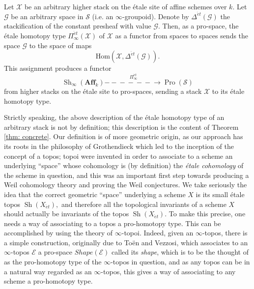 \documentclass[12pt]{amsart}
\theoremstyle{definition}
\newcommand{\cE}{\mathcal{E}}
\newcommand{\cG}{\mathcal{G}}
\newcommand{\cS}{\mathcal{S}}
\newcommand{\cX}{\mathcal{X}}
\newcommand{\Sh}{\operatorname{Sh}}
\newcommand{\Hom}{\mathrm{Hom}}
\newcommand{\et}{\acute{e}t}
\renewcommand{\i}{\infty}
\def\Pro{\operatorname{Pro}}
\def\Shi{\Sh_\i}
\def\Shape{\mathit{Shape}}
\def\longlongrightarrow{-\!\!\!-\!\!\!-\!\!\!-\!\!\!-\!\!\!-\!\!\!\longrightarrow}
\begin{document}
Let $\cX$ be an arbitrary higher stack on the \'etale site of affine schemes over $k.$ Let $\cG$ be an arbitrary space in $\cS$ (i.e. an $\i$-groupoid). Denote by $\Delta^{\et}\left(\cG\right)$ the stackification of the constant presheaf with value $\cG.$ Then, as a pro-space, the \'etale homotopy type $\Pi^{\et}_\i\left(\cX\right)$ of $\cX$ as a functor from spaces to spaces sends the space $\cG$ to the space of maps $$\Hom\left(\cX,\Delta^{\et}\left(\cG\right)\right).$$
This assignment produces a functor
$$\Shi\left(\mathbf{Aff}_k\right) \stackrel{\Pi^{\et}_\i}{\longlongrightarrow} \Pro\left(\cS\right)$$
from higher stacks on the \'etale site to pro-spaces, sending a stack $\cX$ to its \'etale homotopy type.
 

Strictly speaking, the above description of the \'etale homotopy type of an arbitrary stack is not by definition; this description is the content of Theorem \ref{thm: concrete}. Our definition is of more geometric origin, as our approach has its roots in the philosophy  of Grothendieck which led to the inception of the concept of a topos; topoi were invented in order to associate to a scheme an underlying ``space'' whose cohomology is (by definition) the \emph{\'etale cohomology} of the scheme in question, and this was an important first step towards producing a Weil cohomology theory and proving the Weil conjectures. We take seriously the idea that the correct geometric ``space'' underlying a scheme $X$ is its small \'etale topos $\Sh\left(X_{\et}\right),$ and therefore all the topological invariants of a scheme $X$ should actually be invariants of the topos $\Sh\left(X_{\et}\right).$ To make this precise, one needs a way of associating to a topos a pro-homotopy type. This can be accomplished by using the theory of $\i$-topoi. Indeed, given an $\i$-topos, there is a simple construction, originally due to To\"{e}n and Vezzosi, which associates to an $\i$-topos $\cE$ a pro-space $\Shape\left(\cE\right)$ called its \emph{shape}, which is to be the thought of as the pro-homotopy type of the $\i$-topos in question, and as any topos can be in a natural way regarded as an $\i$-topos, this gives a way of associating to any scheme a pro-homotopy type.
\end{document}
